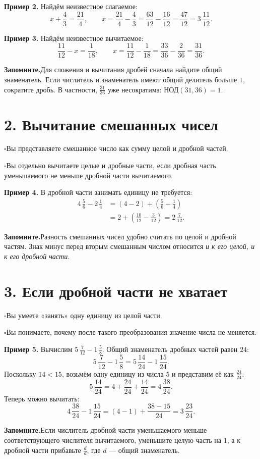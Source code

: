 \documentclass[a4paper,12pt]{article}
\newcommand{\sectionline}[1]{\section*{\color{darkaccent}#1}}
\newcommand{\learn}[1]{\par\noindent$\square$\enspace #1\par}
\newcommand{\keyidea}[1]{\par\noindent\textcolor{darkaccent}{\textbf{Запомните.}}\enspace #1\par}
\begin{document}
\textbf{Пример 2.} Найдём неизвестное слагаемое:
\[
 x+\frac43=\frac{21}{4},\qquad
 x=\frac{21}{4}-\frac43
  =\frac{63}{12}-\frac{16}{12}
  =\frac{47}{12}=3\,\frac{11}{12}.
\]

\textbf{Пример 3.} Найдём неизвестное вычитаемое:
\[
 \frac{11}{12}-x=\frac1{18},\qquad
 x=\frac{11}{12}-\frac1{18}
 =\frac{33}{36}-\frac2{36}=\frac{31}{36}.
\]

\keyidea{Для сложения и вычитания дробей сначала найдите общий знаменатель. Если числитель и знаменатель имеют общий делитель больше $1$, сократите дробь. В частности, $\frac{31}{36}$ уже несократима: $\text{НОД}(31,36)=1$.}

\clearpage
\sectionline{2. Вычитание смешанных чисел}
\learn{Вы представляете смешанное число как сумму целой и дробной частей.}
\learn{Вы отдельно вычитаете целые и дробные части, если дробная часть уменьшаемого не меньше дробной части вычитаемого.}

\textbf{Пример 4.} В дробной части занимать единицу не требуется:
\begin{align*}
 4\,\frac56-2\,\frac14
 &=(4-2)+\left(\frac56-\frac14\right)\\
 &=2+\left(\frac{10}{12}-\frac3{12}\right)
 =2\,\frac7{12}.
\end{align*}

\keyidea{Разность смешанных чисел удобно считать по целой и дробной частям. Знак минус перед вторым смешанным числом относится \emph{и к его целой, и к его дробной части}.}

\sectionline{3. Если дробной части не хватает}
\learn{Вы умеете «занять» одну единицу из целой части.}
\learn{Вы понимаете, почему после такого преобразования значение числа не меняется.}

\textbf{Пример 5.} Вычислим $5\,\frac7{12}-1\,\frac58$.
Общий знаменатель дробных частей равен $24$:
\[
 5\,\frac7{12}-1\,\frac58
 =5\,\frac{14}{24}-1\,\frac{15}{24}.
\]
Поскольку $14<15$, возьмём одну единицу из числа $5$ и представим её как $\frac{24}{24}$:
\[
 5\,\frac{14}{24}
 =4+\frac{24}{24}+\frac{14}{24}
 =4\,\frac{38}{24}.
\]
Теперь можно вычитать:
\[
 4\,\frac{38}{24}-1\,\frac{15}{24}
 =(4-1)+\frac{38-15}{24}
 =\boxed{3\,\frac{23}{24}}.
\]

\keyidea{Если числитель дробной части уменьшаемого меньше соответствующего числителя вычитаемого, уменьшите целую часть на $1$, а к дробной части прибавьте $\frac{d}{d}$, где $d$ --- общий знаменатель.}
\end{document}
